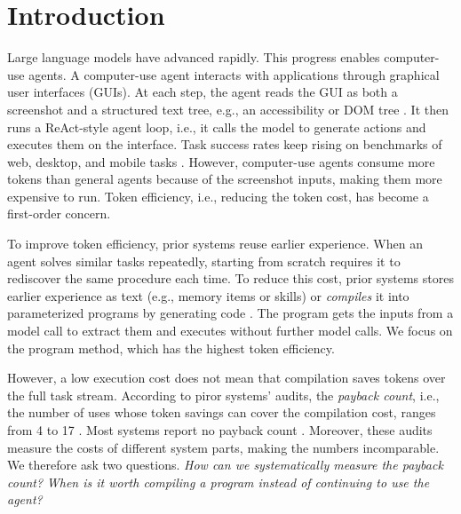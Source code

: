

\section{Introduction}
\label{sec:intro}

Large language models have advanced rapidly.
This progress enables computer-use agents.
A computer-use agent interacts with applications through graphical user interfaces (GUIs).
At each step, the agent reads the GUI as both a screenshot and a structured text tree, e.g., an accessibility or DOM tree \citep{hong2024cogagent,zhang2025ufo}.
It then runs a ReAct-style \citep{yao2023react} agent loop, i.e., it calls the model to generate actions and executes them on the interface.
Task success rates keep rising on benchmarks of web, desktop, and mobile tasks \citep{xie2024osworld,rawles2025androidworld}.
However, computer-use agents consume more tokens than general agents because of the screenshot inputs, making them more expensive to run.
Token efficiency, i.e., reducing the token cost, has become a first-order concern.

To improve token efficiency, prior systems reuse earlier experience.
When an agent solves similar tasks repeatedly, starting from scratch requires it to rediscover the same procedure each time.
To reduce this cost, prior systems stores earlier experience as text (e.g., memory items or skills) \citep{wang2025awm,zheng2024synapse} or \textit{compiles} it into parameterized programs by generating code \citep{wang2025asi,li2026preact,chen2026autorpa,elyadouni2026tracecompiler}.
The program gets the inputs from a model call to extract them and executes without further model calls.
We focus on the program method, which has the highest token efficiency.

However, a low execution cost does not mean that compilation saves tokens over the full task stream.
According to piror systems' audits, the \emph{payback count}, i.e., the number of uses whose token savings can cover the compilation cost, ranges from 4 \citep{chen2026autorpa} to 17 \citep{trooskens2026compiledai}.
Most systems report no payback count \citep{elyadouni2026tracecompiler,xu2026skillsmith}.
Moreover, these audits measure the costs of different system parts, making the numbers incomparable.
We therefore ask two questions.
\emph{How can we systematically measure the payback count?}
\emph{When is it worth compiling a program instead of continuing to use the agent?}

